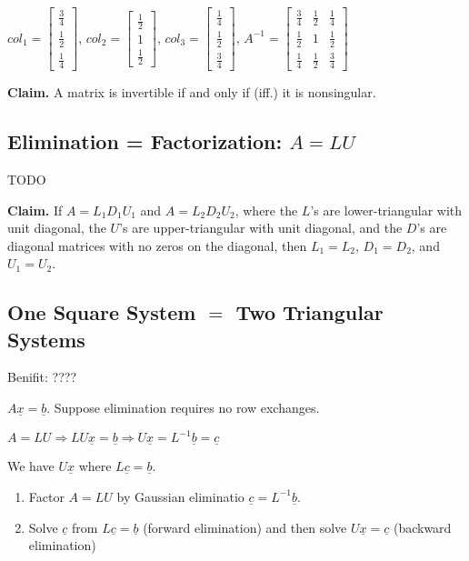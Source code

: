 \documentclass[12pt,a4paper]{article}
\begin{document}
$
col_1 = 
\begin{bmatrix}
  \frac{3}{4} \\
  \frac{1}{2} \\
  \frac{1}{4}
\end{bmatrix}
$, 
$
col_2 =
\begin{bmatrix}
  \frac{1}{2} \\
  1 \\
  \frac{1}{2}
\end{bmatrix}
$,
$
col_3 =
\begin{bmatrix}
  \frac{1}{4} \\
  \frac{1}{2} \\
  \frac{3}{4}
\end{bmatrix}
$,
$
A^{-1} =
\begin{bmatrix}
  \frac{3}{4} & \frac{1}{2} & \frac{1}{4} \\
  \frac{1}{2} & 1 & \frac{1}{2} \\
  \frac{1}{4} & \frac{1}{2} & \frac{3}{4}
\end{bmatrix}
$

\textbf{Claim.} A matrix is invertible if and only if (iff.) it is nonsingular.

\subsection*{Elimination = Factorization: $A = LU$}

TODO

\textbf{Claim.} If $A = L_1D_1U_1$ and $A = L_2D_2U_2$, where the $L$'s are lower-triangular with unit diagonal,
the $U$'s are upper-triangular with unit diagonal, and the $D$'s are diagonal matrices with no zeros on the diagonal,
then $L_1 = L_2$, $D_1 = D_2$, and $U_1 = U_2$.

\subsection*{One Square System $=$ Two Triangular Systems}

Benifit: ????

$A\underline{x} = \underline{b}$. Suppose elimination requires no row exchanges.

$A = LU \Rightarrow LU\underline{x} = \underline{b} \Rightarrow U\underline{x} = L^{-1}\underline{b} = \underline{c}$

We have $U\underline{x}$ where $L\underline{c} = \underline{b}$.

\begin{enumerate}
  \item Factor $A= LU$ by Gaussian eliminatio $\underline{c} = L^{-1}\underline{b}$.
  \item Solve $\underline{c}$ from $L\underline{c} = \underline{b}$ (forward elimination) and then solve $U\underline{x} = \underline{c}$ (backward elimination)
\end{enumerate}
\end{document}
